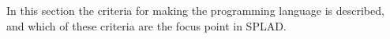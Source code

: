 In this section the criteria for making the programming language is described, and which of these criteria are the focus point in SPLAD.